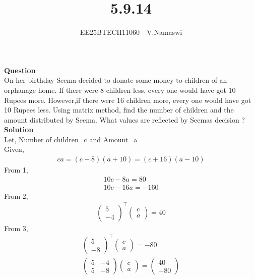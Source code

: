 \documentclass[journal]{IEEEtran}
\begin{document}

\vspace{3cm}

\title{5.9.14}
\author{EE25BTECH11060 - V.Namaswi}
{\let\newpage\relax\maketitle}
\renewcommand{\thefigure}{\theenumi}
\renewcommand{\thetable}{\theenumi}
\setlength{\intextsep}{10pt} %
\textbf{Question}\\On her birthday Seema decided to donate some money to children of an orphanage home. If there were 8 children less, every one would have got  10 Rupees more. However,if there were 16 children more, every one would have got  10 Rupees less. Using matrix method, find the number of children and the amount distributed by Seema. What values are reflected by Seemas decision ?\\
\textbf{Solution}\\
Let, Number of children=c and Amount=a\\
Given,\\
\begin{align}
   ca=(c-8)(a+10)=(c+16)(a-10) 
\end{align}
From 1,
\begin{align}
    10c-8a=80\\
    10c-16a=-160
\end{align}
From 2,
\begin{align}
    \begin{pmatrix}
        5 \\ -4
    \end{pmatrix}^\top \begin{pmatrix}
        c \\ a
    \end{pmatrix}=40
    \end{align}
    From 3,
\begin{align}
    \begin{pmatrix}
     5  \\ -8   
    \end{pmatrix}^\top \begin{pmatrix}
        c \\ a
    \end{pmatrix}=-80\\
    \begin{pmatrix}
        5 & -4 \\
        5 & -8
    \end{pmatrix}\begin{pmatrix}
        c \\ a
    \end{pmatrix}=\begin{pmatrix}
        40 \\ -80
    \end{pmatrix}
\end{align}
\end{document}
